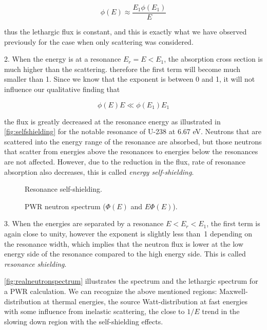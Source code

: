 $$\phi(E) \approx \frac{E_1\phi(E_1)}{E}$$

\noindent thus the lethargic flux is constant, and this is exactly what we have observed previously for the case when only scattering was considered.

2. When the energy is at a resonance $E_r=E<E_1$, the absorption cross section is much higher than the scattering. therefore the first term will become much smaller than 1. Since we know that the exponent is between 0 and 1, it will not influence our qualitative finding that 

$$\phi(E)E \ll \phi(E_1)E_1$$

\noindent the flux is greatly decreased at the resonance energy as illustrated in \autoref{fig:selfshielding} for the notable resonance of U-238 at 6.67 eV. Neutrons that are scattered into the energy range of the resonance are absorbed, but those neutrons that scatter from energies above the resonances to energies below the resonances are not affected. However, due to the reduction in the flux, rate of resonance absorption also decreases, this is called \textit{energy self-shielding}.

\begin{figure}[ht!]
\protect {}\protect
\caption{\label{fig:selfshielding} \footnotesize{Resonance self-shielding.}}
\end{figure}
 
\begin{figure}[ht!]
\protect {}\protect
\caption{\label{fig:realneutronspectrum} \footnotesize{PWR neutron spectrum ($\Phi(E)$ and $E\Phi(E)$).}}
\end{figure}

3. When the energies are separated by a resonance $E<E_r<E_1$, the first term is again close to unity, however the exponent is slightly less than~1 depending on the resonance width, which implies that the neutron flux is lower at the low energy side of the resonance compared to the high energy side. This is called \textit{resonance shielding}.

\autoref{fig:realneutronspectrum} illustrates the spectrum and the lethargic spectrum for a PWR calculation. We can recognize the above mentioned regions: Maxwell-distribution at thermal energies, the source Watt-distribution at fast energies with some influence from inelastic scattering, the close to $1/E$ trend in the slowing down region with the self-shielding effects.

